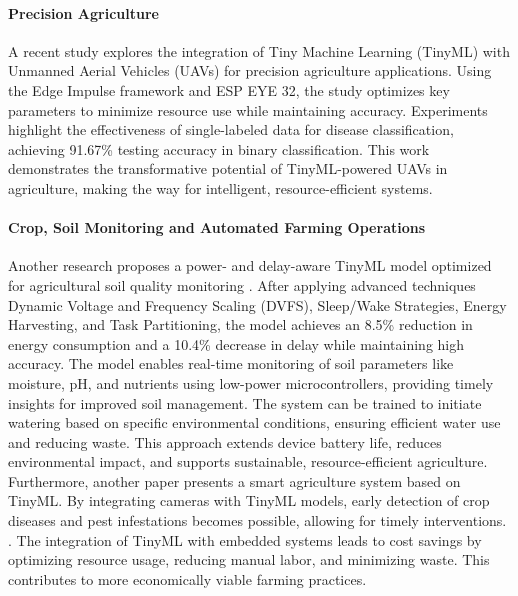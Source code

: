 \documentclass[twocolumn]{article}
\begin{document}
\paragraph{Precision Agriculture}
A recent study explores the integration of Tiny Machine Learning (TinyML) with Unmanned Aerial Vehicles (UAVs) for precision agriculture applications. Using the Edge Impulse framework and ESP EYE 32, the study optimizes key parameters to minimize resource use while maintaining accuracy. Experiments highlight the effectiveness of single-labeled data for disease classification, achieving 91.67\% testing accuracy in binary classification. This work demonstrates the transformative potential of TinyML-powered UAVs in agriculture, making the way for intelligent, resource-efficient systems. \cite{annadata_tinyml_2024}


\paragraph{Crop, Soil Monitoring and Automated Farming Operations}

Another research proposes a power- and delay-aware TinyML model optimized for agricultural soil quality monitoring \cite{bhattacharya_deploying_2024}. After applying advanced techniques Dynamic Voltage and Frequency Scaling (DVFS), Sleep/Wake Strategies, Energy Harvesting, and Task Partitioning, the model achieves an 8.5\% reduction in energy consumption and a 10.4\% decrease in delay while maintaining high accuracy. The model enables real-time monitoring of soil parameters like moisture, pH, and nutrients using low-power microcontrollers, providing timely insights for improved soil management. The system can be trained to initiate watering based on specific environmental conditions, ensuring efficient water use and reducing waste. This approach extends device battery life, reduces environmental impact, and supports sustainable, resource-efficient agriculture. \\[0.1cm]

Furthermore, another paper presents a smart agriculture system based on TinyML. By integrating cameras with TinyML models, early detection of crop diseases and pest infestations becomes possible, allowing for timely interventions. \cite{tsoukas_tinyml-based_2023}. The integration of TinyML with embedded systems leads to cost savings by optimizing resource usage, reducing manual labor, and minimizing waste. This contributes to more economically viable farming practices.
\end{document}
